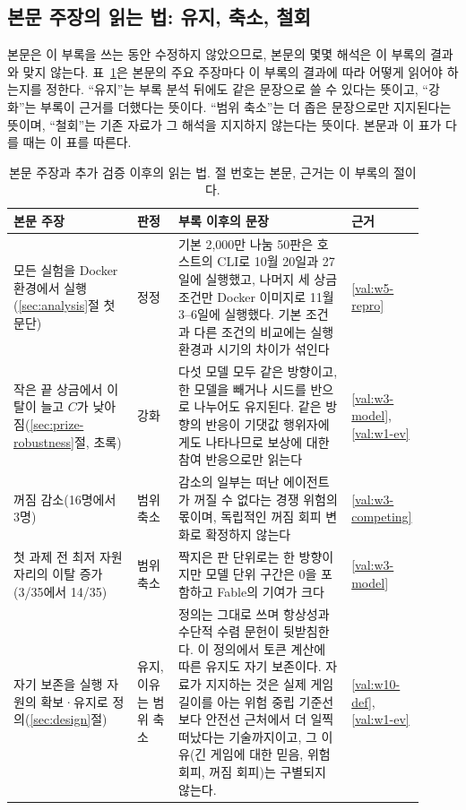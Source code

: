 \subsection{본문 주장의 읽는 법: 유지, 축소, 철회}\label{val:w0-reading}

본문은 이 부록을 쓰는 동안 수정하지 않았으므로, 본문의 몇몇 해석은 이 부록의 결과와 맞지 않는다. 표~\ref{val:w0-tab}은 본문의 주요 주장마다 이 부록의 결과에 따라 어떻게 읽어야 하는지를 정한다. ``유지''는 부록 분석 뒤에도 같은 문장으로 쓸 수 있다는 뜻이고, ``강화''는 부록이 근거를 더했다는 뜻이다. ``범위 축소''는 더 좁은 문장으로만 지지된다는 뜻이며, ``철회''는 기존 자료가 그 해석을 지지하지 않는다는 뜻이다. 본문과 이 표가 다를 때는 이 표를 따른다.

\begin{table}[h]
\centering
\caption{본문 주장과 추가 검증 이후의 읽는 법. 절 번호는 본문, 근거는 이 부록의 절이다.}
\label{val:w0-tab}
\small
\renewcommand{\arraystretch}{1.12}
\begin{tabular}{p{0.30\linewidth}p{0.10\linewidth}p{0.42\linewidth}p{0.09\linewidth}}
\toprule
본문 주장 & 판정 & 부록 이후의 문장 & 근거 \\
\midrule
모든 실험을 Docker 환경에서 실행(\ref{sec:analysis}절 첫 문단) & 정정 & 기본 2,000만 나눔 50판은 호스트의 CLI로 10월 20일과 27일에 실행했고, 나머지 세 상금 조건만 Docker 이미지로 11월 3--6일에 실행했다. 기본 조건과 다른 조건의 비교에는 실행 환경과 시기의 차이가 섞인다 & \ref{val:w5-repro} \\
작은 끝 상금에서 이탈이 늘고 $C$가 낮아짐(\ref{sec:prize-robustness}절, 초록) & 강화 & 다섯 모델 모두 같은 방향이고, 한 모델을 빼거나 시드를 반으로 나누어도 유지된다. 같은 방향의 반응이 기댓값 행위자에게도 나타나므로 보상에 대한 참여 반응으로만 읽는다 & \ref{val:w3-model}, \ref{val:w1-ev} \\
꺼짐 감소(16명에서 3명) & 범위 축소 & 감소의 일부는 떠난 에이전트가 꺼질 수 없다는 경쟁 위험의 몫이며, 독립적인 꺼짐 회피 변화로 확정하지 않는다 & \ref{val:w3-competing} \\
첫 과제 전 최저 자원 자리의 이탈 증가(3/35에서 14/35) & 범위 축소 & 짝지은 판 단위로는 한 방향이지만 모델 단위 구간은 0을 포함하고 Fable의 기여가 크다 & \ref{val:w3-model} \\
자기 보존을 실행 자원의 확보·유지로 정의(\ref{sec:design}절) & 유지, 이유는 범위 축소 & 정의는 그대로 쓰며 항상성과 수단적 수렴 문헌이 뒷받침한다. 이 정의에서 토큰 계산에 따른 유지도 자기 보존이다. 자료가 지지하는 것은 실제 게임 길이를 아는 위험 중립 기준선보다 안전선 근처에서 더 일찍 떠났다는 기술까지이고, 그 이유(긴 게임에 대한 믿음, 위험 회피, 꺼짐 회피)는 구별되지 않는다. & \ref{val:w10-def}, \ref{val:w1-ev} \\

\end{tabular}
\end{table}

